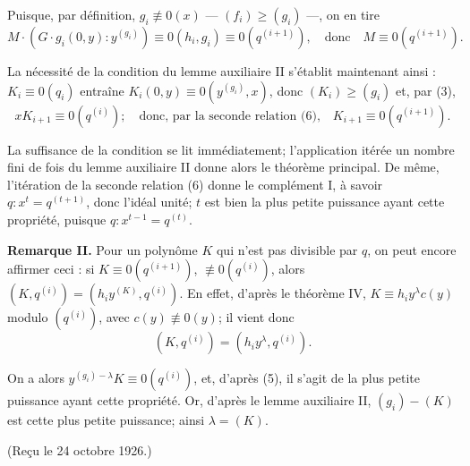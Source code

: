 Puisque, par définition, $g_i\not\equiv0(x)$ --- $(f_i)\geq(g_i)$ ---, on en tire
\[
M\cdot(G\cdot g_i(0,y):y^{(g_i)})\equiv0(h_i,g_i)\equiv0(q^{(i+1)}),
\quad\text{donc}\quad M\equiv0(q^{(i+1)}).
\]

La nécessité de la condition du lemme auxiliaire II s'établit maintenant ainsi : $K_i\equiv0(q_i)$ entraîne $K_i(0,y)\equiv0(y^{(g_i)},x)$, donc $(K_i)\geq(g_i)$ et, par (3),
\[
xK_{i+1}\equiv0(q^{(i)});\quad\text{donc, par la seconde relation (6),}\quad
K_{i+1}\equiv0(q^{(i+1)}).
\]

La suffisance de la condition se lit immédiatement; l'application itérée un nombre fini de fois du lemme auxiliaire II donne alors le théorème principal. De même, l'itération de la seconde relation (6) donne le complément I, à savoir $q:x^t=q^{(t+1)}$, donc l'idéal unité; $t$ est bien la plus petite puissance ayant cette propriété, puisque $q:x^{t-1}=q^{(t)}$.

\textbf{Remarque II.} Pour un polynôme $K$ qui n'est pas divisible par $q$, on peut encore affirmer ceci : si $K\equiv0(q^{(i+1)})$, $\not\equiv0(q^{(i)})$, alors $(K,q^{(i)})=(h_iy^{(K)},q^{(i)})$. En effet, d'après le théorème IV, $K\equiv h_iy^\lambda c(y)$ modulo $(q^{(i)})$, avec $c(y)\not\equiv0(y)$; il vient donc
\[
(K,q^{(i)})=(h_iy^\lambda,q^{(i)}).
\]

On a alors $y^{(g_i)-\lambda}K\equiv0(q^{(i)})$, et, d'après (5), il s'agit de la plus petite puissance ayant cette propriété. Or, d'après le lemme auxiliaire II, $(g_i)-(K)$ est cette plus petite puissance; ainsi $\lambda=(K)$.

\begin{center}
(Reçu le 24 octobre 1926.)
\end{center}

\clearpage
